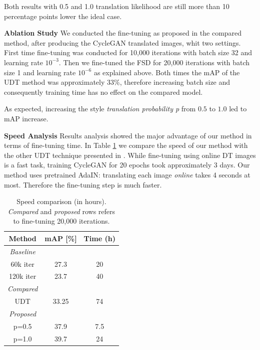 \documentclass[10pt,twocolumn,letterpaper]{article}
\begin{document}
Both results with 0.5 and 1.0 translation likelihood are still more than 10 percentage points lower the ideal case.

\vspace{3mm}

\textbf{Ablation Study}  We conducted the fine-tuning as proposed in the compared method, after producing the CycleGAN translated images, whit two settings. First time fine-tuning was conducted for 10,000 iterations with batch size 32 and learning rate \(10^{-3}\). Then we fine-tuned the FSD for 20,000 iterations with batch size 1 and learning rate \(10^{-6}\) as explained above. Both times the mAP of the UDT method was approximately 33\%, therefore increasing batch size and consequently training time has no effect on the compared model.

As expected, increasing the style {\it translation probability p} from \(0.5\) to \(1.0\) led to mAP increase. 

\vspace{3mm}

\textbf{Speed Analysis} Results analysis showed the major advantage of our method in terms of fine-tuning time. In Table \ref{table:tableTimes} we compare the speed of our method with the other UDT technique presented in \cite{CrossDomObjDet}. While fine-tuning using online DT images is a fast task, training CycleGAN \cite{CGAN} for 20 epochs took approximately 3 days. Our method uses pretrained AdaIN\cite{AdaIN}: translating each image {\it online} takes 4 seconds at most. Therefore the fine-tuning step is much faster.

\begin{table}
\caption{Speed comparison (in hours). {\it Compared} and {\it proposed} rows refers to fine-tuning 20,000 iterations. \label{table:tableTimes}}
\begin{center}
\begin{tabular}{ccc}
\hline
Method & mAP [\%] & Time (h) \\
\hline
\hline
{\it Baseline} \\
60k iter & 27.3 & 20 \\
120k iter & 23.7 & 40 \\

\hline 
{\it Compared} \\
UDT & 33.25 & 74 \\

\hline
{\it Proposed} \\
p=0.5 & 37.9 & 7.5 \\
p=1.0 & 39.7 & 24 \\

\hline

\end{tabular}
\end{center}
\end{table}
\end{document}
